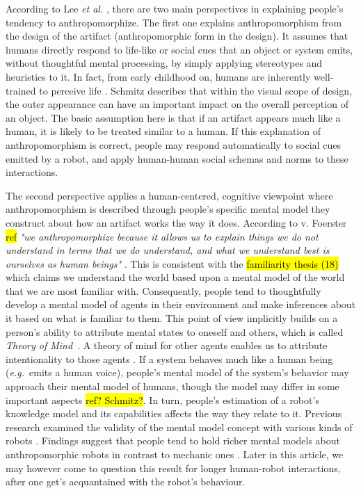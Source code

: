 \documentclass[lettersize, apacite, twoside, HRI]{apa_HRI}
\newcommand{\eg}{{\textit{e.g.~}}}
\begin{document}
	According to Lee \textit{et al.} \cite{lee_human_2005}, there are two main perspectives in explaining people's tendency to anthropomorphize. The first one explains anthropomorphism from the design of the artifact (anthropomorphic form in the design). It assumes that humans directly respond to life-like or social cues that an object or system emits, without thoughtful mental processing, by simply applying stereotypes and heuristics to it. In fact, from early childhood on, humans are inherently well-trained to perceive life \cite{epley_seeing_2007}. Schmitz \cite{schmitz_concepts_2011} describes that within the visual scope of design, the outer appearance can have an important impact on the overall perception of an object. The basic assumption here is that if an artifact appears much like a human, it is likely to be treated similar to a human. If this explanation of anthropomorphism is correct, people may respond automatically to social cues emitted by a robot, and apply human-human social schemas and norms to these interactions.
	
    The second perspective applies a human-centered, cognitive viewpoint where anthropomorphism is described through people's specific mental model they construct about how an artifact works the way it does. According to v. Foerster \hl{ref} \textit{"we anthropomorphize because it allows us to explain things we do not understand in terms that we do understand, and what we understand best is ourselves as human beings"} \cite{hegel_understanding_2008}. This is consistent with the \hl{familiarity thesis (18)} \cite{hegel_understanding_2008} which claims we understand the world based upon a mental model of the world that we are most familiar with. Consequently, people tend to thoughtfully develop a mental model of agents in their environment and make inferences about it based on what is familiar to them. This point of view implicitly builds on a person's ability to attribute mental states to oneself and others, which is called \textit{Theory of Mind}~\cite{Premack1978}. A theory of  mind for other agents enables us to attribute intentionality to those agents \cite{leslie_pretense_1987,admoni_multi-category_2012}. If a system behaves much like a human being (\eg emits a human voice), people's mental model of the system's behavior may approach their mental model of humans, though the model may differ in some important aspects \hl{ref? Schmitz?}. In turn, people's estimation of a robot's knowledge model and its capabilities affects the way they relate to it. Previous research examined the validity of the mental model concept with various kinds of robots \cite{schmitz_concepts_2011,kiesler_mental_2002}. Findings suggest that people tend to hold richer mental models about anthropomorphic robots in contrast to mechanic ones \cite{kiesler_mental_2002}. Later in this article, we may however come to question this result for longer human-robot interactions, after one get's acquantained with the robot's behaviour.
\end{document}
